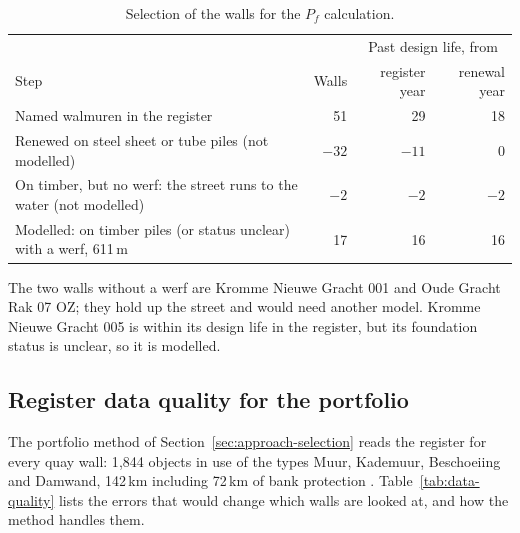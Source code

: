 \begin{table}[htbp]
\centering
\small
\caption{Selection of the walls for the $P_f$ calculation.}
\label{tab:selection}
\begin{tabularx}{\textwidth}{@{}X r r r@{}}
\toprule
& & \multicolumn{2}{c}{Past design life, from} \\
Step & Walls & register year & renewal year \\
\midrule
Named walmuren in the register & 51 & 29 & 18 \\
\quad Renewed on steel sheet or tube piles (not modelled) & $-32$ & $-11$ & 0 \\
\quad On timber, but no werf: the street runs to the water (not modelled) & $-2$ & $-2$ & $-2$ \\
Modelled: on timber piles (or status unclear) with a werf, 611\,m & 17 & 16 & 16 \\
\bottomrule
\end{tabularx}
\end{table}

The two walls without a werf are Kromme Nieuwe Gracht 001 and Oude Gracht
Rak 07 OZ; they hold up the street and would need another model. Kromme
Nieuwe Gracht 005 is within its design life in the register, but its
foundation status is unclear, so it is modelled.

\subsection{Register data quality for the portfolio}\label{app:data-quality}

The portfolio method of Section~\ref{sec:approach-selection} reads the register
for every quay wall: 1{,}844 objects in use of the types Muur, Kademuur,
Beschoeiing and Damwand, 142\,km including 72\,km of bank protection
\parencite{gu2025register}. Table~\ref{tab:data-quality} lists the errors that
would change which walls are looked at, and how the method handles them.

